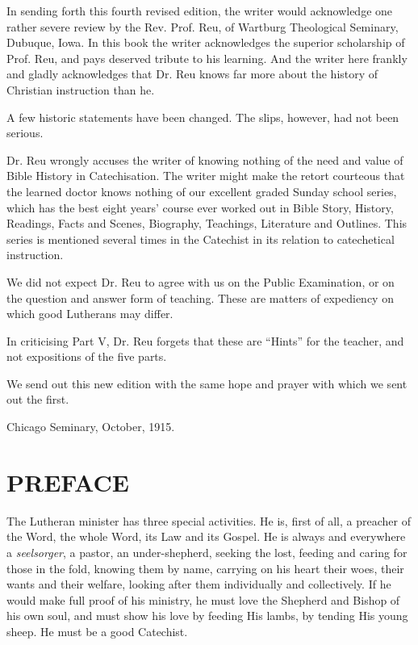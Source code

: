 In sending forth this fourth revised edition, the writer would acknowledge one rather severe review by the Rev. Prof. Reu, of Wartburg Theological Seminary, Dubuque, Iowa. In this book the writer acknowledges the superior scholarship of Prof. Reu, and pays deserved tribute to his learning. And the writer here frankly and gladly acknowledges that Dr. Reu knows far more about the history of Christian instruction than he.

A few historic statements have been changed. The slips, however, had not been serious.

Dr. Reu wrongly accuses the writer of knowing nothing of the need and value of Bible History in
Catechisation. The writer might make the retort courteous that the learned doctor knows nothing of our excellent graded Sunday school series, which has the best eight years’ course ever worked out in Bible Story, History, Readings, Facts and Scenes, Biography, Teachings, Literature and Outlines. This series is mentioned several times in the Catechist in its relation to catechetical instruction.

We did not expect Dr. Reu to agree with us on the Public Examination, or on the question and answer form of teaching. These are matters of expediency on which good Lutherans may differ.

In criticising Part V, Dr. Reu forgets that these are “Hints” for the teacher, and not expositions of the five parts.

We send out this new edition with the same hope and prayer with which we sent out the first.

\begin{unterschrift}
Chicago Seminary, October, 1915.
\end{unterschrift}

\chapter{PREFACE}

The Lutheran minister has three special activities. He is, first of all, a preacher of the Word, the whole Word, its Law and its Gospel. He is always and everywhere a \emph{seelsorger}, a pastor, an under-shepherd, seeking the lost, feeding and caring for those in the fold, knowing them by name, carrying on his heart their woes, their wants and their welfare, looking after them individually and collectively. If he would make full proof of his ministry, he must love the Shepherd and Bishop of his own soul, and must show his love by feeding His lambs, by tending His young sheep. He must be a good Catechist.

